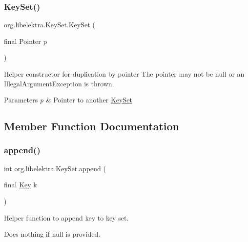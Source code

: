 \subsubsection{\texorpdfstring{Key\+Set()}{KeySet()}\hspace{0.1cm}{\footnotesize\ttfamily [2/2]}}
{\footnotesize\ttfamily org.\+libelektra.\+Key\+Set.\+Key\+Set (\begin{DoxyParamCaption}\item[{final Pointer}]{p }\end{DoxyParamCaption})\hspace{0.3cm}{\ttfamily [inline]}}



Helper constructor for duplication by pointer The pointer may not be null or an Illegal\+Argument\+Exception is thrown. 


\begin{DoxyParams}{Parameters}
{\em p} & Pointer to another \hyperlink{classorg_1_1libelektra_1_1KeySet}{Key\+Set} \\
\hline
\end{DoxyParams}


\subsection{Member Function Documentation}
\mbox{\label{classorg_1_1libelektra_1_1KeySet_a5c1738709f8ccda0929204c9151e773e}} 
\subsubsection{\texorpdfstring{append()}{append()}\hspace{0.1cm}{\footnotesize\ttfamily [1/2]}}
{\footnotesize\ttfamily int org.\+libelektra.\+Key\+Set.\+append (\begin{DoxyParamCaption}\item[{final \hyperlink{classorg_1_1libelektra_1_1Key}{Key}}]{k }\end{DoxyParamCaption})\hspace{0.3cm}{\ttfamily [inline]}}



Helper function to append key to key set. 

Does nothing if null is provided.


